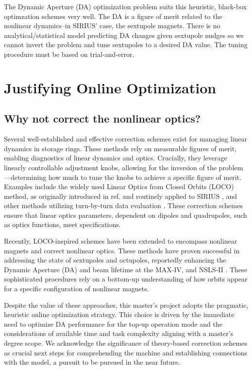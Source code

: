 The Dynamic Aperture (DA) optimization problem suits this heuristic, black-box optimzation schemes very well. The DA is a figure of merit related to the nonlinear dynamics--in SIRIUS' case, the sextupole magnets. There is no analytical/statistical model predicting DA changes given sextupole nudges so we cannot invert the problem and tune sextupoles to a desired DA value. The tuning procedure must be based on trial-and-error.

\section{Justifying Online Optimization}
\subsection{Why not correct the nonlinear optics?}
Several well-established and effective correction schemes exist for managing linear dynamics in storage rings. These methods rely on measurable figures of merit, enabling diagnostics of linear dynamics and optics. Crucially, they leverage linearly controllable adjustment knobs, allowing for the inversion of the problem—determining how much to tune the knobs to achieve a specific figure of merit. Examples include the widely used Linear Optics from Closed Orbits (LOCO) method, as originally introduced in ref.\cite{safranek_experimental_1997} and routinely applied to SIRIUS \cite{alves_linear_2021, alves_optics_2021}, and other methods utilizing turn-by-turn data evaluation \cite[chapter 5]{huang_beam-based_2019}. These correction schemes ensure that linear optics parameters, dependent on dipoles and quadrupoles, such as optics functions, meet specifications.

Recently, LOCO-inspired schemes have been extended to encompass nonlinear magnets and correct nonlinear optics. These methods have proven successful in addressing the state of sextupoles and octupoles, reportedly enhancing the Dynamic Aperture (DA) and beam lifetime at the MAX-IV, \cite{olsson_nonlinear_2020} and NSLS-II \cite{li_nonlinear_2024}. These sophisticated procedures rely on a bottom-up understanding of how orbits appear for a specific configuration of nonlinear magnets.

Despite the value of these approaches, this master's project adopts the pragmatic, heuristic online optimization strategy. This choice is driven by the immediate need to optimize DA performance for the top-up operation mode and the considerations of available time and task complexity aligning with a master's degree scope. We acknowledge the significance of theory-based correction schemes as crucial next steps for comprehending the machine and establishing connections with the model, a pursuit to be pursued in the near future.

